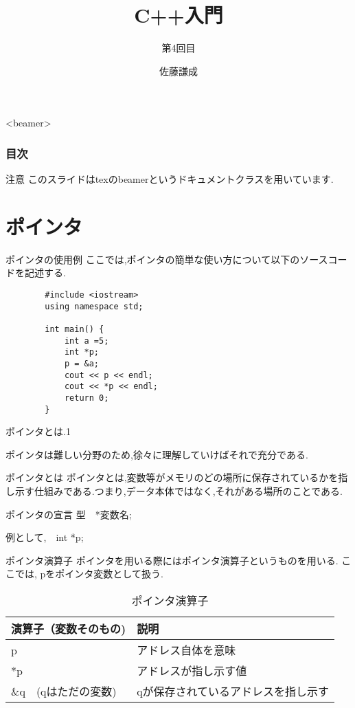 \documentclass[xdvipdfmx, 8pt, t]{beamer}
\title{C++入門}
\subtitle{第4回目}
\author{佐藤謙成}
\begin{document}
\begin{frame}
    \titlepage
\end{frame}

\begin{frame}<beamer>
\frametitle{目次}
    \tableofcontents[]
\end{frame}

\begin{frame}{注意}
    このスライドはtexのbeamerというドキュメントクラスを用いています.
\end{frame}

\section{ポインタ}
\begin{frame}[fragile]{ポインタの使用例}
    ここでは,ポインタの簡単な使い方について以下のソースコードを記述する.
    \begin{lstlisting}
        #include <iostream>
        using namespace std;

        int main() {
            int a =5;
            int *p;
            p = &a;
            cout << p << endl;
            cout << *p << endl;
            return 0;
        }
    \end{lstlisting}
\end{frame}

\begin{frame}{ポインタとは.1}
    \begin{alertblock}{}
        ポインタは難しい分野のため,徐々に理解していけばそれで充分である.
    \end{alertblock}
    \begin{block}{ポインタとは}
        ポインタとは,変数等がメモリのどの場所に保存されているかを指し示す仕組みである.つまり,データ本体ではなく,それがある場所のことである.
    \end{block}
    \begin{block}{ポインタの宣言}
        型　*変数名;

        例として,　int *p;
    \end{block}
    \begin{block}{ポインタ演算子}
        ポインタを用いる際にはポインタ演算子というものを用いる.
        ここでは, pをポインタ変数として扱う.
        \begin{table}[h]
            \centering
            \begin{tabular}{|l|l|}
                \hline
                演算子（変数そのもの) & 説明\\
                \hline
                p & アドレス自体を意味\\
                *p & アドレスが指し示す値\\
                \&q　(qはただの変数) & qが保存されているアドレスを指し示す\\
                \hline
            \end{tabular}
            \caption{ポインタ演算子}
            \label{tab:my_label}
        \end{table}
    \end{block}
\end{frame}
\end{document}
